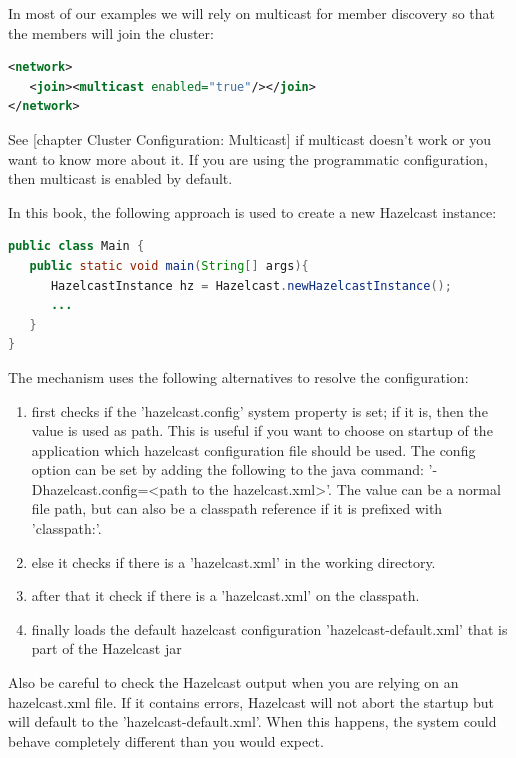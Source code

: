 In most of our examples we will rely on multicast for member discovery so that the members will join the cluster:
\begin{lstlisting}[language=xml]
<network>
   <join><multicast enabled="true"/></join>
</network>
\end{lstlisting}
See [chapter Cluster Configuration: Multicast] if multicast doesn't work or you want to know more about it. If you are using the programmatic configuration, then multicast is enabled by default.

In this book, the following approach is used to create a new Hazelcast instance:
\begin{lstlisting}[language=java]
public class Main {
   public static void main(String[] args){
      HazelcastInstance hz = Hazelcast.newHazelcastInstance();
      ...
   }
}
\end{lstlisting}
The mechanism uses the following alternatives to resolve the configuration:
\begin{enumerate}
\item first checks if the 'hazelcast.config' system property is set; if it is, then the value is used as path. This is useful if you want to choose on startup of the application which hazelcast configuration file should be used. The config option can be set by adding the following to the java command: '-Dhazelcast.config=<path to the hazelcast.xml>'. The value can be a normal file path, but can also be a classpath reference if it is prefixed with 'classpath:'. 
\item else it checks if there is a 'hazelcast.xml' in the working directory.
\item after that it check if there is a 'hazelcast.xml' on the classpath. 
\item finally loads the default hazelcast configuration 'hazelcast-default.xml' that is part of the Hazelcast jar
\end{enumerate}
Also be careful to check the Hazelcast output when you are relying on an hazelcast.xml file. If it contains errors, Hazelcast will not abort the startup but will default to the 'hazelcast-default.xml'. When this happens, the system could behave completely different than you would expect.

